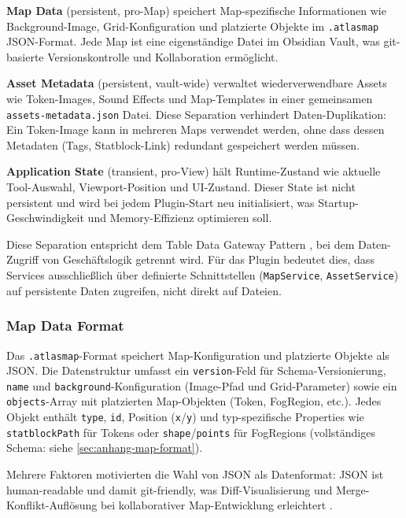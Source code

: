 \textbf{Map Data} (persistent, pro-Map) speichert Map-spezifische Informationen wie Background-Image, Grid-Konfiguration und platzierte Objekte im \texttt{.atlasmap} JSON-Format. Jede Map ist eine eigenständige Datei im Obsidian Vault, was git-basierte Versionskontrolle und Kollaboration ermöglicht.

\textbf{Asset Metadata} (persistent, vault-wide) verwaltet wiederverwendbare Assets wie Token-Images, Sound Effects und Map-Templates in einer gemeinsamen \texttt{assets-metadata.json} Datei. Diese Separation verhindert Daten-Duplikation: Ein Token-Image kann in mehreren Maps verwendet werden, ohne dass dessen Metadaten (Tags, Statblock-Link) redundant gespeichert werden müssen.

\textbf{Application State} (transient, pro-View) hält Runtime-Zustand wie aktuelle Tool-Auswahl, Viewport-Position und \ac{UI}-Zustand. Dieser State ist nicht persistent und wird bei jedem Plugin-Start neu initialisiert, was Startup-Geschwindigkeit und Memory-Effizienz optimieren soll.

Diese Separation entspricht dem Table Data Gateway Pattern \autocite{FowlerTableDataGateway2024}, bei dem Daten-Zugriff von Geschäftslogik getrennt wird. Für das Plugin bedeutet dies, dass Services ausschließlich über definierte Schnittstellen (\texttt{MapService}, \texttt{AssetService}) auf persistente Daten zugreifen, nicht direkt auf Dateien.

\subsubsection{Map Data Format}

Das \texttt{.atlasmap}-Format speichert Map-Konfiguration und platzierte Objekte als \ac{JSON}. Die Datenstruktur umfasst ein \texttt{version}-Feld für Schema-Versionierung, \texttt{name} und \texttt{background}-Konfiguration (Image-Pfad und Grid-Parameter) sowie ein \texttt{objects}-Array mit platzierten Map-Objekten (Token, FogRegion, etc.). Jedes Objekt enthält \texttt{type}, \texttt{id}, Position (\texttt{x}/\texttt{y}) und typ-spezifische Properties wie \texttt{statblockPath} für Tokens oder \texttt{shape}/\texttt{points} für FogRegions (vollständiges Schema: siehe \autoref{sec:anhang-map-format}).

Mehrere Faktoren motivierten die Wahl von \ac{JSON} als Datenformat: \ac{JSON} ist human-readable und damit git-friendly, was Diff-Visualisierung und Merge-Konflikt-Auflösung bei kollaborativer Map-Entwicklung erleichtert \autocite{JSON2017}.

